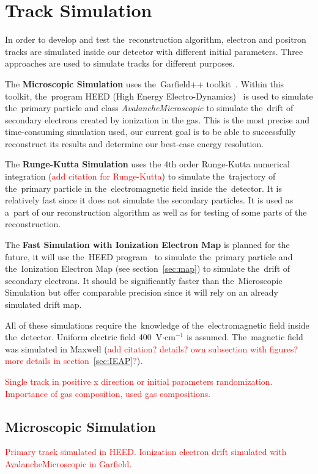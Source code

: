 \chapter{Track Simulation}
	In order to develop and test the~reconstruction algorithm, electron and positron tracks are simulated inside our detector with different initial parameters. Three approaches are used to simulate tracks for different purposes.
	
	The \textbf{Microscopic Simulation} uses the~Garfield++ toolkit~\cite{Garfield++}. Within this toolkit, the~program HEED (High Energy Electro-Dynamics)~\cite{HEED} is used to simulate the~primary particle and class \textit{AvalancheMicroscopic} to simulate the~drift of secondary electrons created by ionization in the gas. This is the most precise and time-consuming simulation used, our current goal is to be able to successfully reconstruct its results and determine our best-case energy resolution.
	
	The \textbf{Runge-Kutta Simulation} uses the 4th order Runge-Kutta numerical integration (\textcolor{red}{add citation for Runge-Kutta}) to simulate the~trajectory of the~primary particle in the~electromagnetic field inside the~detector. It is relatively fast since it does not simulate the secondary particles. It is used as a~part of our reconstruction algorithm as well as for testing of some parts of the reconstruction.
	
	The \textbf{Fast Simulation with Ionization Electron Map} is planned for the future, it will use the~HEED program~\cite{HEED} to simulate the~primary particle and the~Ionization Electron Map (see section~\ref{sec:map}) to simulate the~drift of secondary electrons. It should be significantly faster than the~Microscopic Simulation but offer comparable precision since it will rely on an already simulated drift map.
	
	All of these simulations require the~knowledge of the~electromagnetic field inside the~detector. Uniform electric field 400~V$\cdot$cm$^{-1}$ is assumed. The~magnetic field was simulated in Maxwell (\textcolor{red}{add citation? details? own subsection with figures? more details in section~\ref{sec:IEAP}?}).
	
	\textcolor{red}{Single track in positive x direction or initial parameters randomization. Importance of gas composition, used gas compositions.}
	
	\section{Microscopic Simulation}
		\textcolor{red}{Primary track simulated in HEED. Ionization electron drift simulated with AvalancheMicroscopic in Garfield.}
		
